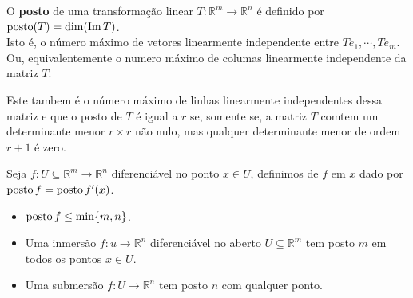 \begin{definition}
  O \textbf{posto} de uma transformação linear $T:\mathbb{R}^{m}\to\mathbb{R}^{n}$ é definido por $\operatorname{posto}(T)=\dim(\operatorname{Im} T)$.\\
  Isto é, o número máximo de vetores linearmente independente entre $Te_1,\cdots,Te_m$.\\
  Ou, equivalentemente o numero máximo de columas linearmente independente da matriz $T$.
\end{definition}
\begin{note}
  Este tambem é o número máximo de linhas linearmente independentes dessa matriz e que o posto de $T$ é igual a $r$ se, somente se, a matriz $T$ comtem um determinante menor $r\times r$ não nulo, mas qualquer determinante menor de ordem $r+1$ é zero. 
\end{note}
\begin{definition}
  Seja $f:U\subseteq \mathbb{R}^{m}\to\mathbb{R}^{n}$ diferenciável no ponto $x\in U$, definimos  de $f$ em $x$ dado por $\operatorname{posto} f=\operatorname{posto} f^{\prime}(x)$. 
\end{definition}
\begin{note}
  \phantom{xxx}
  \begin{itemize}
    \item $\operatorname{posto} f\leq\min\{m,n\}$.
    \item Uma inmersão $f:u\to\mathbb{R}^{n}$ diferenciável no aberto $U\subseteq\mathbb{R}^{m}$ tem posto $m$ em todos os pontos $x\in U$.
    \item Uma submersão $f:U\to\mathbb{R}^{n}$ tem posto $n$ com qualquer ponto. 
  \end{itemize}
\end{note}
